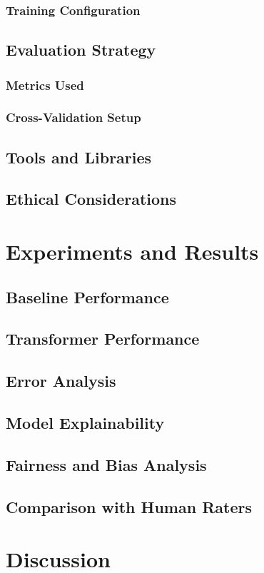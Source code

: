 \documentclass[10pt]{report}
\begin{document}
\subsection{Training Configuration}
\section{Evaluation Strategy}
\subsection{Metrics Used}
\subsection{Cross-Validation Setup}
\section{Tools and Libraries}
\section{Ethical Considerations}


\chapter{Experiments and Results}
\section{Baseline Performance}
\section{Transformer Performance}
\section{Error Analysis}
\section{Model Explainability}
\section{Fairness and Bias Analysis}
\section{Comparison with Human Raters}


\chapter{Discussion}
\end{document}
